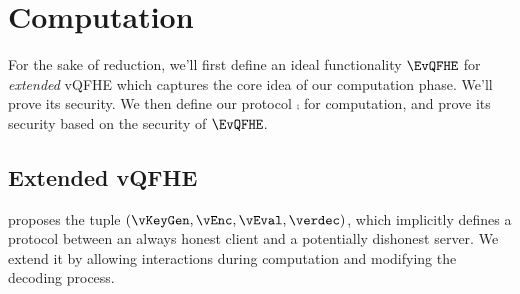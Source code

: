 \section{Computation}


For the sake of reduction, we'll first define an ideal functionality $\EvQFHE$ for \emph{extended} vQFHE which captures the core idea of our computation phase.
We'll prove its security. We then define our protocol $\comp$ for computation, and prove its security based on the security of $\EvQFHE$.

\subsection{Extended vQFHE}

\cite{magic_circuits} proposes the tuple $(\vKeyGen, \vEnc, \vEval, \verdec)$,
which implicitly defines a protocol between an always honest client and a potentially dishonest server.
We extend it by allowing interactions during computation and modifying the decoding process.

